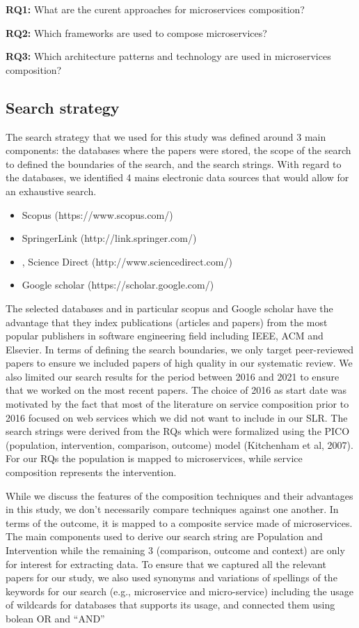 \documentclass{article}
\begin{document}
\textbf{RQ1:} What are the curent approaches for microservices composition?

\textbf{RQ2:} Which frameworks are used to compose microservices?

\textbf{RQ3:} Which architecture patterns and technology are used in microservices composition?

\subsection{Search strategy}

The search strategy that we used for this study was defined around 3 main components: the databases where the papers were stored, the scope of the search to defined the boundaries of the search, and the search strings.
With regard to the databases, we identified 4 mains electronic data sources that would allow for an exhaustive search.

\begin{itemize}
\item Scopus (https://www.scopus.com/)
\item SpringerLink (http://link.springer.com/)
\item, Science Direct (http://www.sciencedirect.com/)
\item Google scholar (https://scholar.google.com/)
\end{itemize}

The selected databases and in particular scopus and Google scholar have the advantage that they index publications (articles and papers) from the most popular publishers in software engineering field including IEEE, ACM and Elsevier.
In terms of defining the search boundaries, we only target peer-reviewed papers to ensure we included papers of high quality in our systematic review. We also limited our search results for the period between 2016 and 2021 to ensure that we worked on the most recent papers. The choice of 2016 as start date was motivated by the fact that most of the literature on service composition prior to 2016 focused on web services which we did not want to include in our SLR.
The search strings were derived from the RQs which were formalized using the PICO (population, intervention, comparison, outcome) model (Kitchenham et al, 2007). For our RQs the population is mapped to microservices, while service composition represents the intervention.

While we discuss the features of the composition techniques and their advantages in this study, we don’t necessarily compare techniques against one another. In terms of the outcome, it is mapped to a composite service made of microservices. The main components used to derive our search string are Population and Intervention while the remaining 3 (comparison, outcome and context) are only for interest for extracting data. To ensure that we captured all the relevant papers for our study, we also used synonyms and variations of spellings of the keywords for our search (e.g., microservice and micro-service) including the usage of wildcards for databases that supports its usage, and connected them using bolean OR and “AND”
\end{document}

